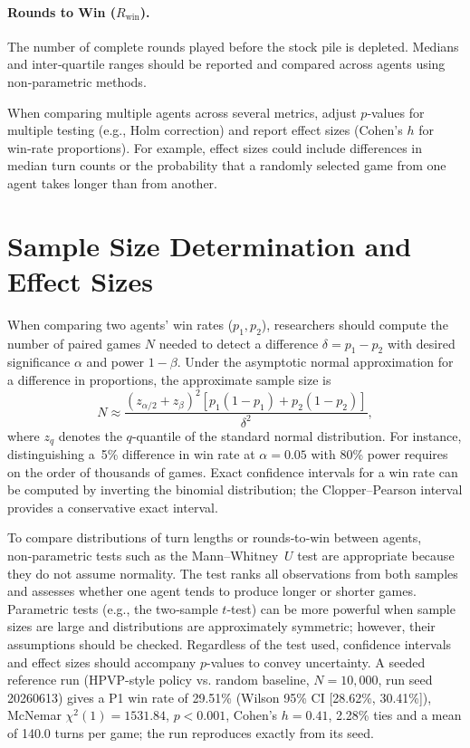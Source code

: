 \documentclass[twoside]{mitthesis}
\begin{document}
\paragraph{Rounds to Win ($R_{\text{win}}$).}  The number of complete rounds played before the stock pile is depleted.  Medians and inter‑quartile ranges should be reported and compared across agents using non‑parametric methods.

When comparing multiple agents across several metrics, adjust $p$‑values for multiple testing (e.g., Holm correction) and report effect sizes (Cohen's $h$ for win‑rate proportions).  For example, effect sizes could include differences in median turn counts or the probability that a randomly selected game from one agent takes longer than from another.

\section{Sample Size Determination and Effect Sizes}
When comparing two agents’ win rates ($p_1,p_2$), researchers should compute the number of paired games $N$ needed to detect a difference $\delta = p_1 - p_2$ with desired significance $\alpha$ and power $1-\beta$.  Under the asymptotic normal approximation for a difference in proportions, the approximate sample size is
\begin{equation}
N \approx \frac{(z_{\alpha/2} + z_{\beta})^2 [p_1(1-p_1) + p_2(1-p_2)]}{\delta^2},
\end{equation}
where $z_q$ denotes the $q$‑quantile of the standard normal distribution.  For instance, distinguishing a 5\% difference in win rate at $\alpha=0.05$ with 80\% power requires on the order of thousands of games.  Exact confidence intervals for a win rate can be computed by inverting the binomial distribution; the Clopper–Pearson interval provides a conservative exact interval.

To compare distributions of turn lengths or rounds‑to‑win between agents, non‑parametric tests such as the Mann–Whitney $U$ test are appropriate because they do not assume normality.  The test ranks all observations from both samples and assesses whether one agent tends to produce longer or shorter games.  Parametric tests (e.g., the two‑sample $t$‑test) can be more powerful when sample sizes are large and distributions are approximately symmetric; however, their assumptions should be checked.  Regardless of the test used, confidence intervals and effect sizes should accompany $p$-values to convey uncertainty. A seeded reference run (HPVP-style policy vs. random baseline, $N=10{,}000$, run seed 20260613) gives a P1 win rate of 29.51\% (Wilson 95\% CI [28.62\%, 30.41\%]), McNemar $\chi^2(1)=1531.84$, $p<0.001$, Cohen's $h=0.41$, 2.28\% ties and a mean of 140.0 turns per game; the run reproduces exactly from its seed.
\end{document}

